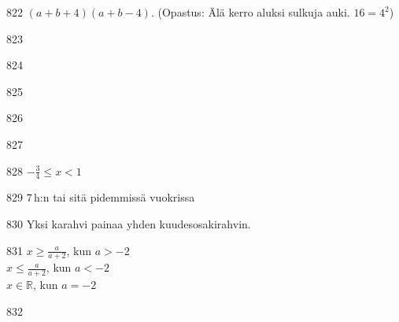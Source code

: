 \begin{Vastaus}{822}
		$(a+b+4)(a+b-4)$. (Opastus: Älä kerro aluksi sulkuja auki. $16=4^2$)
    
\end{Vastaus}
\begin{Vastaus}{823}
    
\end{Vastaus}
\begin{Vastaus}{824}
    
\end{Vastaus}
\begin{Vastaus}{825}
    
\end{Vastaus}
\begin{Vastaus}{826}
    
\end{Vastaus}
\begin{Vastaus}{827}
    
\end{Vastaus}
\begin{Vastaus}{828}
        $-\frac{3}{4} \leq x < 1$
    
\end{Vastaus}
\begin{Vastaus}{829}
	$7$\,h:n tai sitä pidemmissä vuokrissa
    
\end{Vastaus}
\begin{Vastaus}{830}
			Yksi karahvi painaa yhden kuudesosakirahvin.
	
\end{Vastaus}
\begin{Vastaus}{831}
        $x \geq \frac{a}{a+2}$, kun $a > -2$ \\
        $x \leq \frac{a}{a+2}$, kun $a < -2$ \\
    $x \in \mathbb{R}$, kun $a = -2$ \\
	
\end{Vastaus}
\begin{Vastaus}{832}
    
\end{Vastaus}

